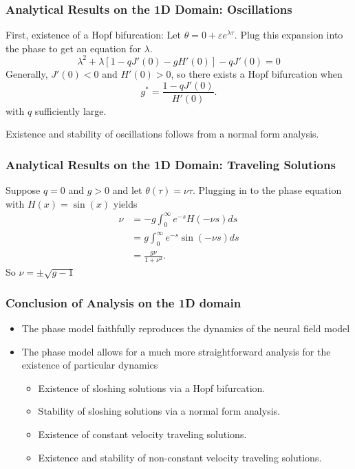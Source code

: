 \documentclass{beamer}
\newcommand{\ve}{\varepsilon}
\begin{document}
\begin{frame}
 \frametitle{Analytical Results on the 1D Domain: Oscillations}
 First, existence of a Hopf bifurcation:
 Let $\theta = 0 + \ve e^{\lambda \tau}$. Plug this expansion into the phase to get an equation for $\lambda$.
\begin{equation*}
\lambda^2 + \lambda[1-qJ'(0)-gH'(0)] - qJ'(0) = 0
\end{equation*}
Generally, $J'(0) < 0$ and $H'(0) > 0$, so there exists a Hopf bifurcation when
\begin{equation*}
 g^* = \frac{1-qJ'(0)}{H'(0)}.
\end{equation*}
with $q$ sufficiently large.

Existence and stability of oscillations follows from a normal form analysis.
\end{frame}

\begin{frame}
\frametitle{Analytical Results on the 1D Domain: Traveling Solutions}
Suppose $q=0$ and $g > 0$ and let $\theta(\tau) = \nu\tau$. Plugging in to the phase equation  with $H(x) = \sin(x)$ yields
\begin{align*}
 \nu &= -g \int_0^\infty e^{-s} H(-\nu s)ds\\
 &= g \int_0^\infty e^{-s} \sin(-\nu s)ds\\
 &= \frac{g\nu}{1+\nu^2}.
\end{align*}
So $\nu = \pm \sqrt{g-1}$
\end{frame}



\begin{frame}
 \frametitle{Conclusion of Analysis on the 1D domain}
 \begin{itemize}
  \item The phase model faithfully reproduces the dynamics of the neural field model
  \item The phase model allows for a much more straightforward analysis for the existence of particular dynamics
  \begin{itemize}
  \item Existence of sloshing solutions via a Hopf bifurcation.
  \item Stability of sloshing solutions via a normal form analysis.
  \item Existence of constant velocity traveling solutions.
  \item Existence and stability of non-constant velocity traveling solutions.
 \end{itemize}
\end{itemize}
\end{frame}
\end{document}
